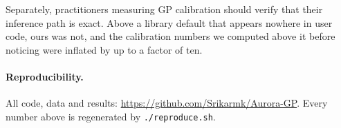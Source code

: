 \documentclass[11pt]{article}
\begin{document}
Separately, practitioners measuring GP calibration should verify that their inference
path is exact. Above a library default that appears nowhere in user code, ours was
not, and the calibration numbers we computed above it before noticing were inflated
by up to a factor of ten.

\paragraph{Reproducibility.} All code, data and results:
\url{https://github.com/Srikarmk/Aurora-GP}. Every number above is regenerated by
\texttt{./reproduce.sh}.

\FloatBarrier


\end{document}
